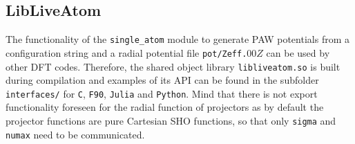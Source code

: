 \documentclass[oribibl]{llncs}
\newcommand{\ttt}[1]{\texttt{#1}}
\begin{document}
\subsection{LibLiveAtom} \label{sec:lib-live-atom}
%
The functionality of the \ttt{single\_atom} module to generate \ac{PAW} potentials from a configuration string and a radial potential file \ttt{pot/Zeff.}$00Z$ can be used by other \ac{DFT} codes.
Therefore, the shared object library \ttt{libliveatom.so} is built during compilation and examples of its \ac{API} can be found in the subfolder \ttt{interfaces/} for \ttt{C}, \ttt{F90}, \ttt{Julia} and \ttt{Python}.
Mind that there is not export functionality foreseen for the radial function of projectors as by default the projector functions are pure Cartesian \ac{SHO} functions, so that only \ttt{sigma} and \ttt{numax} need to be communicated.
\end{document}
